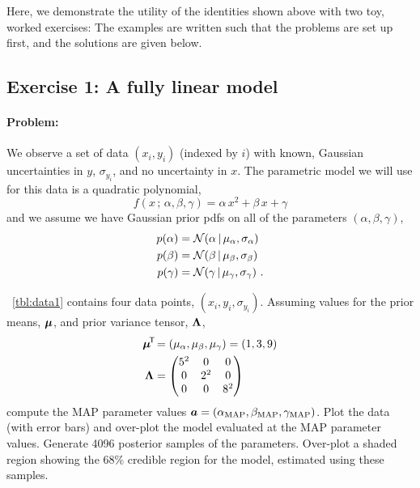 Here, we demonstrate the utility of the identities shown above with two toy,
worked exercises: The examples are written such that the problems are set up
first, and the solutions are given below.


\subsection{Exercise 1: A fully linear model}

\paragraph{Problem:} We observe a set of data $(x_i, y_i)$ (indexed by $i$) with
known, Gaussian uncertainties in $y$, $\sigma_{y_i}$, and no uncertainty in $x$.
The parametric model we will use for this data is a quadratic polynomial,
\begin{equation}
  f(x \,;\, \alpha, \beta, \gamma) = \alpha\,x^2 + \beta\,x + \gamma
\end{equation}
and we assume we have Gaussian prior pdfs on all of the parameters $(\alpha,
\beta, \gamma)$,
\begin{align}
  p(\alpha) &= \mathcal{N}\!\,(\alpha \,|\, \mu_\alpha, \sigma_\alpha)\\
  p(\beta) &= \mathcal{N}\!\,(\beta \,|\, \mu_\beta, \sigma_\beta)\\
  p(\gamma) &= \mathcal{N}\!\,(\gamma \,|\, \mu_\gamma, \sigma_\gamma)
  ~ .
\end{align}

\tablename~\ref{tbl:data1} contains four data points, $(x_i, y_i,
\sigma_{y_i})$.
Assuming values for the prior means, $\boldsymbol{\mu}$, and prior variance tensor,
$\mathbf{\Lambda}$,
\begin{align}
  \boldsymbol{\mu}^{\!\mathsf{T}\!} &= (\mu_\alpha, \mu_\beta, \mu_\gamma) = (1, 3, 9)\\
  \mathbf{\Lambda} &=
    \begin{pmatrix}
      5^2 & 0 & 0\\
      0 & 2^2 & 0\\
      0 & 0 & 8^2
    \end{pmatrix}\\
\end{align}
compute the MAP parameter values $\boldsymbol{a} = (\alpha_{\rm MAP}, \beta_{\rm MAP},
\gamma_{\rm MAP})$.
Plot the data (with error bars) and over-plot the model evaluated at the
MAP parameter values.
Generate 4096 posterior samples of the parameters.
Over-plot a shaded region showing the 68\% credible region for the model,
estimated using these samples.

